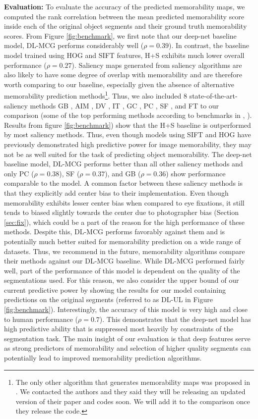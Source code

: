 \noindent \textbf{Evaluation: } To evaluate the accuracy of the predicted memorability maps, we computed the rank correlation between the mean predicted memorability score inside each of the original object segments and their ground truth memorability scores. From Figure \ref{fig:benchmark}, we first note that our deep-net baseline model, DL-MCG performs considerably well ($\rho = 0.39$). In contrast, the baseline model trained using HOG and SIFT features, H+S exhibits much lower overall performance ($\rho = 0.27$). Saliency maps generated from saliency algorithms are also likely to have some degree of overlap with memorability and are therefore worth comparing to our baseline, especially given the absence of alternative memorability prediction methods\footnote{The only other algorithm that generates memorability maps was proposed in \cite{khosla12}. We contacted the authors and they said they will be releasing an updated version of their paper and codes soon. We will add it to the comparison once they release the code.}. Thus, we also included $8$ state-of-the-art-saliency methods GB \cite{gb}, AIM \cite{aim}, DV \cite{dv}, IT \cite{it}, GC \cite{gc}, PC \cite{pc}, SF \cite{sf}, and FT \cite{ft} to our comparison (some of the top performing methods according to benchmarks in \cite{borji13}, \cite{borji12}).  Results from figure \ref{fig:benchmark}) show that the H+S baseline is outperformed by most saliency methods. Thus, even though models using SIFT and HOG have previously demonstrated high predictive power for image memorability, they may not be as well suited for the task of predicting object memorability. The deep-net baseline model, DL-MCG performs better than all other saliency methods and only PC ($\rho=0.38$), SF ($\rho=0.37$), and GB ($\rho=0.36$) show performance comparable to the model. A common factor between these saliency methods is that they explicitly add center bias to their implementation. Even though memorability exhibits lesser center bias when compared to eye fixations, it still tends to biased slightly towards the center due to photographer bias (Section \ref{sec:fix}), which could be a  part of the reason for the high performance of these methods. Despite this, DL-MCG performs favorably against them and is potentially much better suited for memorability prediction on a wide range of datasets. Thus, we recommend in the future, memorability algorithms compare their methods against our DL-MCG baseline. While DL-MCG performed fairly well, part of the performance of this model is dependent on the quality of the segmentations used. For this reason, we also consider the upper bound of our current predictive power by showing the results for our model containing predictions on the original segments (referred to as DL-UL in Figure \ref{fig:benchmark}). Interestingly, the accuracy of this model is very high and close to human performance ($\rho = 0.7$). This demonstrates that the deep-net model has high predictive ability that is suppressed most heavily by constraints of the segmentation task. The main insight of our evaluation is that deep features serve as strong predictors of memorability and selection of higher quality segments can potentially lead to improved memorability prediction algorithms.

